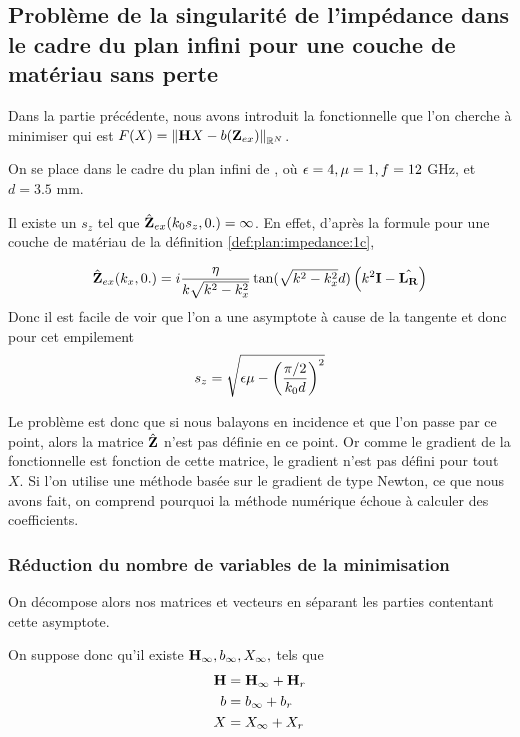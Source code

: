 \subsection{Problème de la singularité de l'impédance dans le cadre du plan infini pour une couche de matériau sans perte}

Dans la partie précédente, nous avons introduit la fonctionnelle que l'on cherche à minimiser qui est \(F(X) = \left\lVert{\mathbf{H}} X - b(\mathbf{Z}_{ex})\right\rVert_{\mathbb R^N}\).

On se place dans le cadre du plan infini de \cite{aubakirov_electromagnetic_2014}, où \(\epsilon=4,\mu=1,f=12\) GHz, et \(d=3.5\) mm. %

Il existe un \(s_z\) tel que \(\hat{\mathbf{Z}}_{ex}(k_0s_z,0.) = \infty\). En effet, d'après la formule pour une couche de matériau de la définition \ref{def:plan:impedance:1c}, 

\begin{equation}
  \hat{\mathbf{Z}}_{ex}(k_x,0.) = i\dfrac{\eta}{k\sqrt{k^2 - k_x^2}}\tan(\sqrt{k^2 - k_x^2}d)\left(k^2\mathbf{I} - \hat{\mathbf{L_R}}\right)
\end{equation}
Donc il est facile de voir que l'on a une asymptote à cause de la tangente et donc pour cet empilement
\begin{equation}
  s_z = \sqrt{\epsilon \mu - \left(\dfrac{\pi/2}{k_0 d}\right)^2}
\end{equation}

Le problème est donc que si nous balayons en incidence et que l'on passe par ce point, alors la matrice \(\hat{\mathbf{Z}}\) n'est pas définie en ce point. Or comme le gradient de la fonctionnelle est fonction de cette matrice, le gradient n'est pas défini pour tout \(X\). Si l'on utilise une méthode basée sur le gradient de type Newton, ce que nous avons fait, on comprend pourquoi la méthode numérique échoue à calculer des coefficients.

\subsubsection{Réduction du nombre de variables de la minimisation}

On décompose alors nos matrices et vecteurs en séparant les parties contentant cette asymptote.

On suppose donc qu'il existe \({\mathbf{H}}_\infty, {b}_\infty, X_\infty,\) tels que
\begin{align*}
  {\mathbf{H}} &= {\mathbf{H}}_\infty + {\mathbf{H}}_r
  \\
  {b} &= {b}_\infty + {b}_r
  \\
  X &= X_\infty + X_r
\end{align*}

